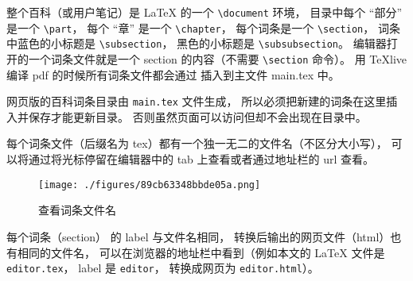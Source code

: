 整个百科（或用户笔记）是 LaTeX 的一个 \verb|\document| 环境， 目录中每个 “部分” 是一个 \verb|\part|， 每个 “章” 是一个 \verb|\chapter|， 每个词条是一个 \verb|\section|， 词条中蓝色的小标题是 \verb|\subsection|， 黑色的小标题是 \verb|\subsubsection|。 编辑器打开的一个词条文件就是一个 section 的内容（不需要 \verb|\section| 命令）。 用 TeXlive 编译 pdf 的时候所有词条文件都会通过 \verb|| 插入到主文件 main.tex 中。

网页版的百科词条目录由 \verb|main.tex| 文件生成， 所以必须把新建的词条在这里插入并保存才能更新目录。 否则虽然页面可以访问但却不会出现在目录中。

每个词条文件（后缀名为 tex）都有一个独一无二的文件名（不区分大小写）， 可以将通过将光标停留在编辑器中的 tab 上查看或者通过地址栏的 url 查看。

\begin{figure}[ht]
\centering
\texttt{[image: ./figures/89cb63348bbde05a.png]}
\caption{查看词条文件名} \label{fig_editor_2}
\end{figure}

每个词条（section） 的 label 与文件名相同， 转换后输出的网页文件（html）也有相同的文件名， 可以在浏览器的地址栏中看到（例如本文的 LaTeX 文件是 \verb|editor.tex|， label 是 \verb|editor|， 转换成网页为 \verb|editor.html|）。

